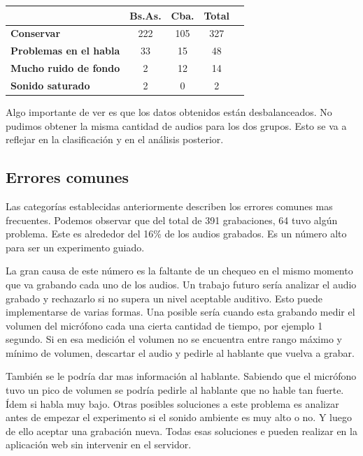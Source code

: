 \documentclass[11pt,a4paper,twoside]{tesis}
\begin{document}
\begin{table}[h]
\centering
\begin{tabular}{|l|c|c|c|c|}
\hline
\textbf{}  & \textbf{Bs.As. } & \textbf{Cba.} & \textbf{Total} \\ \hline
\textbf{Conservar}  & 222 & 105 & 327 \\ \hline
\textbf{Problemas en el habla}  & 33 & 15 & 48 \\ \hline
\textbf{Mucho ruido de fondo}  & 2 & 12 & 14 \\ \hline
\textbf{Sonido saturado}  & 2 & 0 & 2 \\ \hline
\end{tabular}
\end{table}

Algo importante de ver es que los datos obtenidos están desbalanceados. No pudimos obtener la misma cantidad de audios para los dos grupos. Esto se va a reflejar en la clasificación y en el análisis posterior.

\subsection{Errores comunes}

Las categorías establecidas anteriormente describen los errores comunes mas frecuentes. Podemos observar que del total de 391 grabaciones, 64 tuvo algún problema. Este es alrededor del 16\% de los audios grabados. Es un número alto para ser un experimento guiado. 

La gran causa de este número es la faltante de un chequeo en el mismo momento que va grabando cada uno de los audios. Un trabajo futuro sería analizar el audio grabado y rechazarlo si no supera un nivel aceptable auditivo. Esto puede implementarse de varias formas. Una posible sería cuando esta grabando medir el volumen del micrófono cada una cierta cantidad de tiempo, por ejemplo 1 segundo. Si en esa medición el volumen no se encuentra entre rango máximo y mínimo de volumen, descartar el audio y pedirle al hablante que vuelva a grabar.

También se le podría dar mas información al hablante. Sabiendo que el micrófono tuvo un pico de volumen se podría pedirle al hablante que no hable tan fuerte. Ídem si habla muy bajo. Otras posibles soluciones a este problema es analizar antes de empezar el experimento si el sonido ambiente es muy alto o no. Y luego de ello aceptar una grabación nueva. Todas esas soluciones e pueden realizar en la aplicación web sin intervenir en el servidor.
\end{document}
